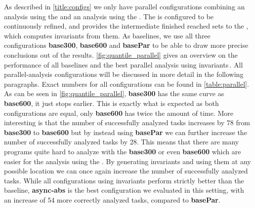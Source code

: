 As described in \autoref{title:configs} we only have parallel configurations combining an analysis using the \PredicateCPA{} and an analysis using the \InvariantsCPA{}.
The \InvariantsCPA{} is configured to be continuously refined, and provides the intermediate finished reached sets to the \PredicateCPA{}, which computes invariants from them.
As baselines, we use all three configurations \textbf{base300}, \textbf{base600} and \textbf{basePar} to be able to draw more precise conclusions out of the results. \autoref{fig:quantile_parallel} gives 
an overview on the performance of all baselines and the best parallel analysis using invariants\,. All parallel-analysis configurations will be discussed in more detail in the following paragraphs. Exact numbers for all 
configurations can be found in \autoref{table:parallel}.
As can be seen in \autoref{fig:quantile_parallel}, \textbf{base300} has the same curve as \textbf{base600}, it just stops earlier. This is exactly what is expected as both configurations are equal,
only \textbf{base600} has twice the amount of time. More interesting is that the number of successfully analyzed tasks increases by \num{78} from \textbf{base300} to \textbf{base600} but by instead
using \textbf{basePar} we can further increase the number of successfully analyzed tasks by \num{28}.
This means that there are many programs quite hard to analyze with the \textbf{base300} or even \textbf{base600} which are easier for the analysis using the \InvariantsCPA{}.
By generating invariants
and using them at any possible location we can once again increase the number of successfully analyzed tasks. While all configurations using invariants perform strictly better than the baseline,
\textbf{async-abs} is the best configuration we evaluated in this setting, with an increase of \num{54} more correctly analyzed tasks, compared to \textbf{basePar}.






